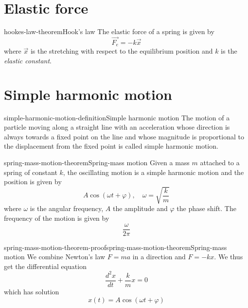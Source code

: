 \documentclass[preview]{standalone}
\begin{document}
\genpage

\section{Elastic force}

\begin{snippettheorem}{hookes-law-theorem}{Hook's law}
    The elastic force of a spring is given by
    \[
        \vec{F_e} = -k \vec{x}
    \]
    where \(\vec{x}\) is the stretching with respect to the equilibrium position
    and \(k\) is the \emph{elastic constant}.
\end{snippettheorem}


\section{Simple harmonic motion}

\begin{snippetdefinition}{simple-harmonic-motion-definition}{Simple harmonic motion}
    The motion of a particle moving along a straight line with an acceleration whose direction is always towards a fixed point on the line and whose magnitude is proportional to the displacement from the fixed point is called simple harmonic motion.
\end{snippetdefinition}

\begin{snippettheorem}{spring-mass-motion-theorem}{Spring-mass motion}
    Given a mass \(m\) attached to a spring of constant \(k\),
    the oscillating motion is a simple harmonic motion and the position is given by
    \[
        A\cos(\omega t + \varphi), \quad \omega = \sqrt{\frac{k}{m}}
    \]
    where \(\omega\) is the angular frequency, \(A\) the amplitude
    and \(\varphi\) the phase shift. The frequency of the motion is given by
    \[
        \frac{\omega}{2\pi}
    \]
\end{snippettheorem}

\begin{snippetproof}{spring-mass-motion-theorem-proof}{spring-mass-motion-theorem}{Spring-mass motion}
    We combine Newton's law \(F = ma\) in a direction and \(F = -kx\).
    We thus get the differential equation
    \[
        \frac{d^2 x}{dt} + \frac{k}{m}x = 0 
    \]
    which has solution
    \[
        x(t) = A \cos(\omega t + \varphi)
    \]
\end{snippetproof}
\end{document}
